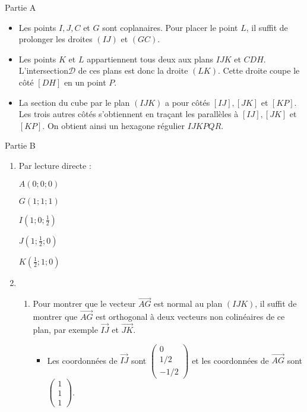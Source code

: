 \begin{corrige}
     \begin{h3}Partie A\end{h3}
     \begin{itemize}
          \item
          Les points $I, J,C$ et $G$ sont coplanaires. Pour placer le point $L$, il suffit de prolonger les droites $(IJ)$ et $(GC)$.
          \item
          Les points $K$ et $L$ appartiennent tous deux aux plans $IJK$ et $CDH$. L'intersection$\mathscr{D}$ de ces plans est donc la droite $(LK)$. Cette droite coupe le côté $[DH]$ en un point $P$.
          \item
          La section du cube par le plan $(IJK)$ a pour côtés $[IJ], [JK]$ et $[KP]$. Les trois autres côtés s'obtiennent en traçant les parallèles à $[IJ], [JK]$ et $[KP]$. On obtient ainsi un hexagone régulier $IJKPQR$.
     \end{itemize}
\begin{center}
\end{center}
     \begin{h3}Partie B\end{h3}
     \begin{enumerate}
          \item
          Par lecture directe :
          \par
          $A(0;0;0)$
          \par
          $G(1;1;1)$
          \par
          $I\left(1;0;\frac{1}{2}\right)$
          \par
          $J\left(1;\frac{1}{2};0\right)$
          \par
          $K\left(\frac{1}{2};1;0\right)$
          \item
          \begin{enumerate}
               \item
               Pour montrer que le vecteur $\overrightarrow{AG}$ est normal au plan $(IJK)$, il suffit de montrer que $\overrightarrow{AG}$ est orthogonal à deux vecteurs non colinéaires de ce plan, par exemple $\overrightarrow{IJ}$ et $\overrightarrow{JK}$.
               \begin{itemize}
                    \item
                    Les coordonnées de $\overrightarrow{IJ}$ sont $\begin{pmatrix} 0 \\ 1/2 \\ -1/2 \end{pmatrix}$ et les coordonnées de $\overrightarrow{AG}$ sont $\begin{pmatrix} 1 \\ 1 \\ 1 \end{pmatrix}$.

\end{itemize}
\end{enumerate}
\end{enumerate}
\end{corrige}
